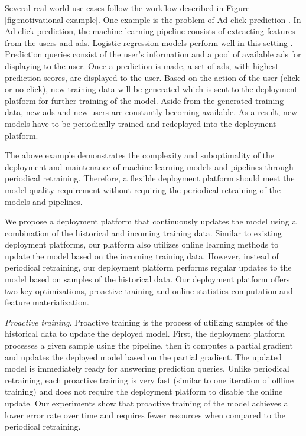 Several real-world use cases follow the workflow described in Figure \ref{fig:motivational-example}.
One example is the problem of Ad click prediction \cite{macmahan2013}.
In Ad click prediction, the machine learning pipeline consists of extracting features from the users and ads. 
Logistic regression models perform well in this setting \cite{macmahan2013}.
Prediction queries consist of the user's information and a pool of available ads for displaying to the user.
Once a prediction is made, a set of ads, with highest prediction scores, are displayed to the user.
Based on the action of the user (click or no click), new training data will be generated which is sent to the deployment platform for further training of the model.
Aside from the generated training data, new ads and new users are constantly becoming available.
As a result, new models have to be periodically trained and redeployed into the deployment platform.

The above example demonstrates the complexity and suboptimality of the deployment and maintenance of machine learning models and pipelines through periodical retraining.
Therefore, a flexible deployment platform should meet the model quality requirement without requiring the periodical retraining of the models and pipelines.

We propose a deployment platform that continuously updates the model using a combination of the historical and incoming training data.
Similar to existing deployment platforms, our platform also utilizes online learning methods to update the model based on the incoming training data.
However, instead of periodical retraining, our deployment platform performs regular updates to the model based on samples of the historical data.
Our deployment platform offers two key optimizations, proactive training and online statistics computation and feature materialization. 

\textit{Proactive training.}
Proactive training is the process of utilizing samples of the historical data to update the deployed model.
First, the deployment platform processes a given sample using the pipeline, then it computes a partial gradient and updates the deployed model based on the partial gradient.
The updated model is immediately ready for answering prediction queries.
Unlike periodical retraining, each proactive training is very fast (similar to one iteration of offline training) and does not require the deployment platform to disable the online update.
Our experiments show that proactive training of the model achieves a lower error rate over time and requires fewer resources when compared to the periodical retraining.

